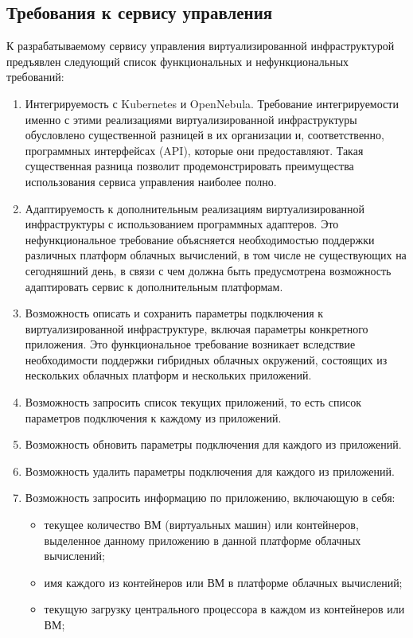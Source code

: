 \subsection{Требования к сервису управления}
\label{requirements}
К разрабатываемому сервису управления виртуализированной инфраструктурой предъявлен следующий список функциональных и нефункциональных требований:
\begin{enumerate}
    \item Интегрируемость с Kubernetes и OpenNebula.
    Требование интегрируемости именно с этими реализациями виртуализированной инфраструктуры обусловлено существенной разницей в их организации и, соответственно, программных интерфейсах (API), которые они предоставляют.
    Такая существенная разница позволит продемонстрировать преимущества использования сервиса управления наиболее полно.
    \item Адаптируемость к дополнительным реализациям виртуализированной инфраструктуры с использованием программных адаптеров.
    Это нефункциональное требование объясняется необходимостью поддержки различных платформ облачных вычислений, в том числе не существующих на сегодняшний день, в связи с чем должна быть предусмотрена возможность адаптировать сервис к дополнительным платформам. 
    \item Возможность описать и сохранить параметры подключения к виртуализированной инфраструктуре, включая параметры конкретного приложения.
    Это функциональное требование возникает вследствие необходимости поддержки гибридных облачных окружений, состоящих из нескольких облачных платформ и нескольких приложений.
    \item Возможность запросить список текущих приложений, то есть список параметров подключения к каждому из приложений. 
    \item Возможность обновить параметры подключения для каждого из приложений.
    \item Возможность удалить параметры подключения для каждого из приложений.
    \item Возможность запросить информацию по приложению, включающую в себя:
    \begin{itemize}
        \item текущее количество ВМ (виртуальных машин) или контейнеров, выделенное данному приложению в данной платформе облачных вычислений;
        \item имя каждого из контейнеров или ВМ в платформе облачных вычислений;
        \item текущую загрузку центрального процессора в каждом из контейнеров или ВМ;

\end{itemize}
\end{enumerate}
